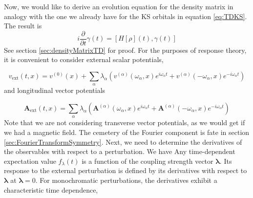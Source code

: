 \documentclass[12pt]{article}
\begin{document}
Now, we would like to derive an evolution equation for the density matrix in analogy with the one we already have for the KS orbitals in equation \ref{eq:TDKS}. The result is
\begin{equation}
i \frac{\partial}{\partial t} \gamma(t) = \left[ H[\rho](t), \gamma(t) \right] 
\label{eq:densityMatrixTD}
\end{equation}
See section \ref{sec:densityMatrixTD} for proof.
For the purposes of response theory, it is convenient to consider external scalar potentials,


\begin{equation}
v_{\mathrm{ext}}(t, x)= v^{(0)}(x)+\sum_{\alpha} \lambda_{\alpha}\left(v^{(\alpha)}\left(\omega_{\alpha}, x\right) e^{i \omega_{\alpha} t}+v^{(\alpha)}\left(-\omega_{\alpha}, x\right) e^{-i \omega_{\alpha} t}\right)
\end{equation}
and longitudinal vector potentials


\begin{equation}
\mathbf{A}_{\mathrm{ext}}(t, x)= \sum_{\alpha} \lambda_{\alpha}\left(\mathbf{A}^{(\alpha)}\left(\omega_{\alpha}, x\right) e^{i \omega_{\alpha} t}+\mathbf{A}^{(\alpha)}\left(-\omega_{\alpha}, x\right) e^{-i \omega_{\alpha} t}\right)
\end{equation}
Note that we are not considering transverse vector potentials, as we would get if we had a magnetic field. The cemetery of the Fourier component is fate in section \ref{sec:FourierTransformSymmetry}. Next, we need to determine the derivatives of the observables with respect to a perturbation. We have
Any time-dependent expectation value $f_{\lambda}(t)$ is a function of the coupling strength vector $\boldsymbol{\lambda}$. Its response to the external perturbation is defined by its derivatives with respect to $\boldsymbol{\lambda}$ at $\boldsymbol{\lambda}=0$. For monochromatic perturbations, the derivatives exhibit a characteristic time dependence,
\end{document}

